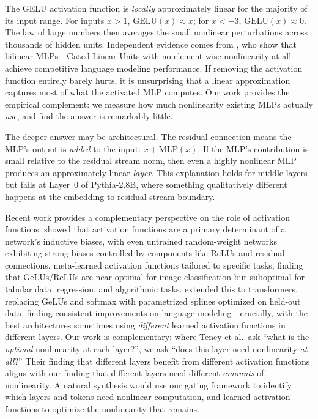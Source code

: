 \documentclass[11pt]{article}
\begin{document}
The GELU activation function is \textit{locally} approximately linear for the majority of its input range. For inputs $x > 1$, $\mathrm{GELU}(x) \approx x$; for $x < -3$, $\mathrm{GELU}(x) \approx 0$. The law of large numbers then averages the small nonlinear perturbations across thousands of hidden units. Independent evidence comes from \citet{dooms2025}, who show that bilinear MLPs---Gated Linear Units with no element-wise nonlinearity at all---achieve competitive language modeling performance. If removing the activation function entirely barely hurts, it is unsurprising that a linear approximation captures most of what the activated MLP computes. Our work provides the empirical complement: we measure how much nonlinearity existing MLPs actually \textit{use}, and find the answer is remarkably little.

The deeper answer may be architectural. The residual connection means the MLP's output is \textit{added} to the input: $x + \mathrm{MLP}(x)$. If the MLP's contribution is small relative to the residual stream norm, then even a highly nonlinear MLP produces an approximately linear \textit{layer}. This explanation holds for middle layers but fails at Layer~0 of Pythia-2.8B, where something qualitatively different happens at the embedding-to-residual-stream boundary.

Recent work provides a complementary perspective on the role of activation functions. \citet{teney2024neural} showed that activation functions are a primary determinant of a network's inductive biases, with even untrained random-weight networks exhibiting strong biases controlled by components like ReLUs and residual connections. \citet{teney2025simplicity} meta-learned activation functions tailored to specific tasks, finding that GeLUs/ReLUs are near-optimal for image classification but suboptimal for tabular data, regression, and algorithmic tasks. \citet{teney2025transformers} extended this to transformers, replacing GeLUs and softmax with parametrized splines optimized on held-out data, finding consistent improvements on language modeling---crucially, with the best architectures sometimes using \emph{different} learned activation functions in different layers. Our work is complementary: where Teney et al.\ ask ``what is the \emph{optimal} nonlinearity at each layer?'', we ask ``does this layer need nonlinearity \emph{at all}?'' Their finding that different layers benefit from different activation functions aligns with our finding that different layers need different \emph{amounts} of nonlinearity. A natural synthesis would use our gating framework to identify which layers and tokens need nonlinear computation, and learned activation functions to optimize the nonlinearity that remains.
\end{document}
